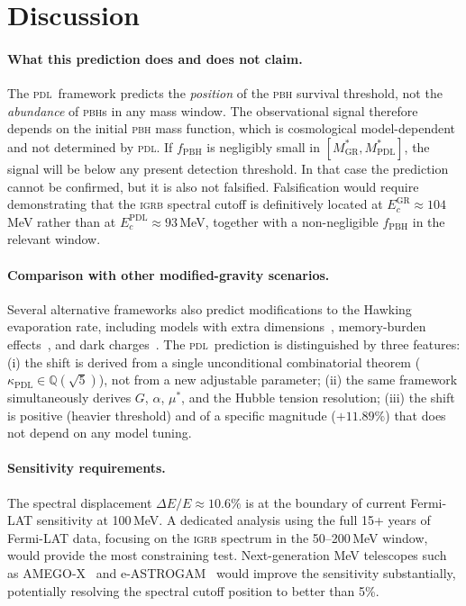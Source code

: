 \documentclass[12pt, a4paper]{article}
\theoremstyle{definition}
\newcommand{\PDL}{\textsc{pdl}}
\newcommand{\kappaPDL}{\kappa_{\mathrm{PDL}}}
\newcommand{\MstarGR}{M^{*}_{\mathrm{GR}}}
\newcommand{\MstarPDL}{M^{*}_{\mathrm{PDL}}}
\begin{document}
\section{Discussion}

\paragraph{What this prediction does and does not claim.}
The \PDL\ framework predicts the \emph{position} of the \textsc{pbh} survival threshold, not the \emph{abundance} of \textsc{pbh}s in any mass window. The observational signal therefore depends on the initial \textsc{pbh} mass function, which is cosmological model-dependent and not determined by \PDL. If $f_{\mathrm{PBH}}$ is negligibly small in $[\MstarGR, \MstarPDL]$, the signal will be below any present detection threshold. In that case the prediction cannot be confirmed, but it is also not falsified. Falsification would require demonstrating that the \textsc{igrb} spectral cutoff is definitively located at $E_c^{\mathrm{GR}} \approx 104$\,MeV rather than at $E_c^{\mathrm{PDL}} \approx 93$\,MeV, together with a non-negligible $f_{\mathrm{PBH}}$ in the relevant window.

\paragraph{Comparison with other modified-gravity scenarios.}
Several alternative frameworks also predict modifications to the Hawking evaporation rate, including models with extra dimensions~\cite{Anchordoqui2022}, memory-burden effects~\cite{Thoss2024}, and dark charges~\cite{Korwar2023}. The \PDL\ prediction is distinguished by three features: (i) the shift is derived from a single unconditional combinatorial theorem ($\kappaPDL \in \mathbb{Q}(\sqrt{5})$), not from a new adjustable parameter; (ii) the same framework simultaneously derives $G$, $\alpha$, $\mu^*$, and the Hubble tension resolution; (iii) the shift is positive (heavier threshold) and of a specific magnitude ($+11.89\%$) that does not depend on any model tuning.

\paragraph{Sensitivity requirements.}
The spectral displacement $\Delta E/E \approx 10.6\%$ is at the boundary of current Fermi-LAT sensitivity at 100\,MeV. A dedicated analysis using the full 15+ years of Fermi-LAT data, focusing on the \textsc{igrb} spectrum in the 50--200\,MeV window, would provide the most constraining test. Next-generation MeV telescopes such as AMEGO-X~\cite{AMEGO} and e-ASTROGAM~\cite{eASTROGAM} would improve the sensitivity substantially, potentially resolving the spectral cutoff position to better than 5\%.
\end{document}
